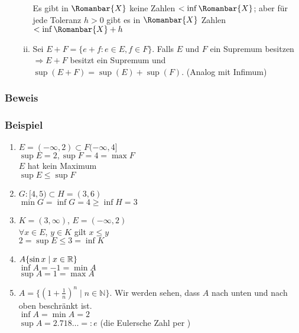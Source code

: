 \begin{enumerate}
\begin{enumerate}[(i)]
\begin{center}
\end{center}



Es gibt in $\Romanbar{X}$ keine Zahlen $<\inf\Romanbar{X}$; aber für jede Toleranz $h>0$ gibt es in $\Romanbar{X}$ Zahlen $<\inf \Romanbar{X}+h$
\item Sei $E+F=\{ e+f:e\in E,f\in F\}$. Falls $E$ und $F$ ein Supremum besitzen $\Rightarrow E+F$ besitzt ein Supremum und $\sup (E+F)=\sup(E)+\sup(F)$. (Analog mit Infimum)
\end{enumerate}
\end{enumerate}
\subsubsection*{Beweis}
\subsubsection*{Beispiel}
\begin{enumerate}
\item $E=(-\infty,2)\subset F(-\infty,4\rbrack$\\
$\sup E=2, \sup F=4=\max F$\\
$E$ hat kein Maximum\\
$\sup E\leq \sup F$
\item $G:\lbrack 4,5)\subset H=(3,6)$\\
$\min G=\inf G=4\geq \inf H=3$
\item $K=(3,\infty)$, $E=(-\infty,2)$\\
$\forall x\in E$, $y\in K$ gilt $x\leq y$\\
$2=\sup E\leq 3=\inf K$
\item $A\{\sin x\mid x\in\mathbb{R}\}$\\
$\inf A=-1=\min A$\\
$\sup A=1=\max A$
\item $A=\{\left( 1+\frac{1}{n}\right)^n\mid n\in\mathbb{N} \}$. Wir werden sehen, dass $A$ nach unten und nach oben beschränkt ist. \\
$\inf A=\min A=2$\\
$\sup A=2.718\dots =: e $ (die Eulersche Zahl per \underline{})\\
\end{enumerate}

